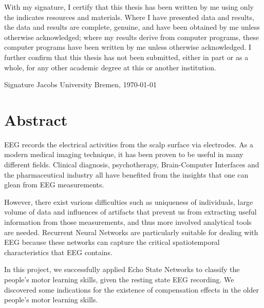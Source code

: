 \documentclass[a4paper,11pt,oneside]{article}
\begin{document}
With my signature, I certify that this thesis has been written by me
using only the indicates resources and materials. Where I have
presented data and results, the data and results are complete,
genuine, and have been obtained by me unless otherwise acknowledged;
where my results derive from computer programs, these computer
programs have been written by me unless otherwise acknowledged. I
further confirm that this thesis has not been submitted, either in
part or as a whole, for any other academic degree at this or another
institution.

\vspace{20mm}

Signature \hfill Jacobs University Bremen, \today

\newpage

\section*{Abstract}
EEG 
 records the electrical activities 
from the scalp surface via electrodes. As a modern medical imaging technique, 
it has been proven to be useful in many different fields. Clinical diagnosis, 
psychotherapy, Brain-Computer Interfaces  and the pharmaceutical industry all have 
benefited from the insights that one can glean from EEG measurements.

However, there exist various difficulties such as uniqueness of individuals, large volume of 
data and influences of artifacts that prevent us from extracting useful information from those 
measurements, and thus more involved analytical tools are needed. Recurrent Neural Networks
are particularly suitable for dealing with EEG because these networks can capture the critical spatiotemporal characteristics
that EEG contains.

In this project, we successfully applied
 Echo State Networks  to classify 
 the  people's motor learning skills,  given the resting state EEG recording. We discovered some indications for the existence of compensation effects in the older people's motor learning skills. 

\newpage
\tableofcontents

\clearpage
{}

\end{document}
